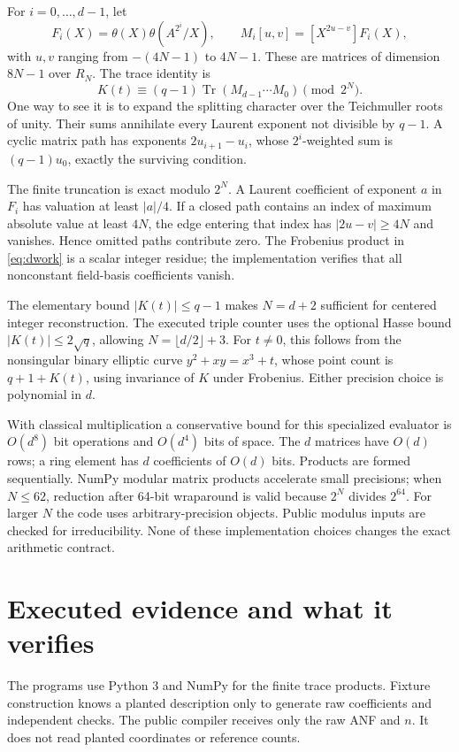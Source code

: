 \documentclass[11pt]{article}
\theoremstyle{remark}\newtheorem{remark}[theorem]{Remark}
\begin{document}
For $i=0,\ldots,d-1$, let
\[
 F_i(X)=\theta(X)\theta(A^{2^i}/X),\qquad
 M_i[u,v]=[X^{2u-v}]F_i(X),
\]
with $u,v$ ranging from $-(4N-1)$ to $4N-1$. These are matrices of dimension $8N-1$ over $R_N$. The trace identity is
\begin{equation}\label{eq:dwork}
 K(t)\equiv(q-1)\operatorname{Tr}(M_{d-1}\cdots M_0)\pmod{2^N}.
\end{equation}
One way to see it is to expand the splitting character over the Teichmuller roots of unity. Their sums annihilate every Laurent exponent not divisible by $q-1$. A cyclic matrix path has exponents $2u_{i+1}-u_i$, whose $2^i$-weighted sum is $(q-1)u_0$, exactly the surviving condition.

The finite truncation is exact modulo $2^N$. A Laurent coefficient of exponent $a$ in $F_i$ has valuation at least $|a|/4$. If a closed path contains an index of maximum absolute value at least $4N$, the edge entering that index has $|2u-v|\ge4N$ and vanishes. Hence omitted paths contribute zero. The Frobenius product in \eqref{eq:dwork} is a scalar integer residue; the implementation verifies that all nonconstant field-basis coefficients vanish.

The elementary bound $|K(t)|\le q-1$ makes $N=d+2$ sufficient for centered integer reconstruction. The executed triple counter uses the optional Hasse bound $|K(t)|\le2\sqrt q$, allowing $N=\lfloor d/2\rfloor+3$. For $t\ne0$, this follows from the nonsingular binary elliptic curve $y^2+xy=x^3+t$, whose point count is $q+1+K(t)$, using invariance of $K$ under Frobenius. Either precision choice is polynomial in $d$.

With classical multiplication a conservative bound for this specialized evaluator is $O(d^8)$ bit operations and $O(d^4)$ bits of space. The $d$ matrices have $O(d)$ rows; a ring element has $d$ coefficients of $O(d)$ bits. Products are formed sequentially. NumPy modular matrix products accelerate small precisions; when $N\le62$, reduction after 64-bit wraparound is valid because $2^N$ divides $2^{64}$. For larger $N$ the code uses arbitrary-precision objects. Public modulus inputs are checked for irreducibility. None of these implementation choices changes the exact arithmetic contract.

\section{Executed evidence and what it verifies}\label{sec:evidence}
The programs use Python 3 and NumPy for the finite trace products. Fixture construction knows a planted description only to generate raw coefficients and independent checks. The public compiler receives only the raw ANF and $n$. It does not read planted coordinates or reference counts.
\end{document}
